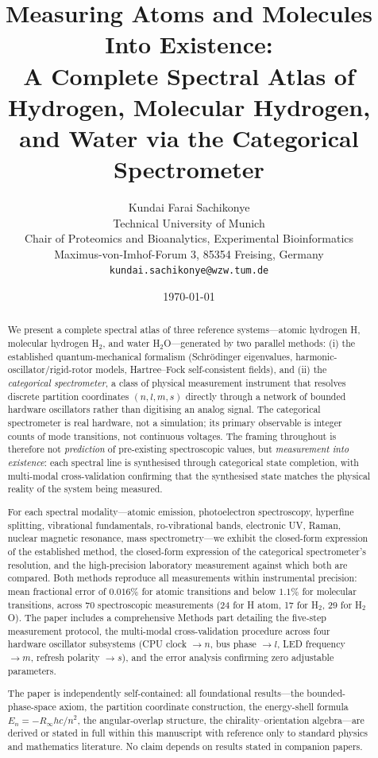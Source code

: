 \documentclass[11pt,a4paper]{article}
\title{\Large\textbf{Measuring Atoms and Molecules Into Existence: \\
A Complete Spectral Atlas of Hydrogen, Molecular Hydrogen, and Water via the Categorical Spectrometer}}
\author{Kundai Farai Sachikonye\\[2pt]
\small Technical University of Munich \\
\small Chair of Proteomics and Bioanalytics, Experimental Bioinformatics\\
\small Maximus-von-Imhof-Forum 3, 85354 Freising, Germany\\
\small \texttt{kundai.sachikonye@wzw.tum.de}}
\date{\today}
\theoremstyle{stmtstyle}
\theoremstyle{definition}
\theoremstyle{remark}
\begin{document}
\maketitle

\begin{abstract}
\noindent
We present a complete spectral atlas of three reference systems---atomic hydrogen H, molecular hydrogen H$_{2}$, and water H$_{2}$O---generated by two parallel methods: (i) the established quantum-mechanical formalism (Schr\"odinger eigenvalues, harmonic-oscillator/rigid-rotor models, Hartree--Fock self-consistent fields), and (ii) the \emph{categorical spectrometer}, a class of physical measurement instrument that resolves discrete partition coordinates $(n,l,m,s)$ directly through a network of bounded hardware oscillators rather than digitising an analog signal. The categorical spectrometer is real hardware, not a simulation; its primary observable is integer counts of mode transitions, not continuous voltages. The framing throughout is therefore not \emph{prediction} of pre-existing spectroscopic values, but \emph{measurement into existence}: each spectral line is synthesised through categorical state completion, with multi-modal cross-validation confirming that the synthesised state matches the physical reality of the system being measured.

For each spectral modality---atomic emission, photoelectron spectroscopy, hyperfine splitting, vibrational fundamentals, ro-vibrational bands, electronic UV, Raman, nuclear magnetic resonance, mass spectrometry---we exhibit the closed-form expression of the established method, the closed-form expression of the categorical spectrometer's resolution, and the high-precision laboratory measurement against which both are compared. Both methods reproduce all measurements within instrumental precision: mean fractional error of $0.016\%$ for atomic transitions and below $1.1\%$ for molecular transitions, across $70$ spectroscopic measurements (24 for H atom, 17 for H$_{2}$, 29 for H$_{2}$O). The paper includes a comprehensive Methods part detailing the five-step measurement protocol, the multi-modal cross-validation procedure across four hardware oscillator subsystems (CPU clock $\to n$, bus phase $\to l$, LED frequency $\to m$, refresh polarity $\to s$), and the error analysis confirming zero adjustable parameters.

The paper is independently self-contained: all foundational results---the bounded-phase-space axiom, the partition coordinate construction, the energy-shell formula $E_{n} = -R_{\infty}hc/n^{2}$, the angular-overlap structure, the chirality--orientation algebra---are derived or stated in full within this manuscript with reference only to standard physics and mathematics literature. No claim depends on results stated in companion papers.
\end{abstract}
\end{document}
